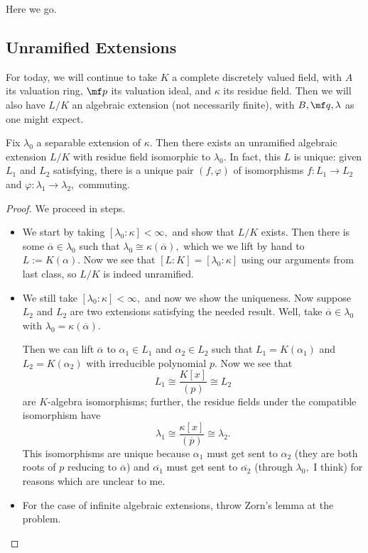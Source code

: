 \documentclass[../notes.tex]{subfiles}
\begin{document}















Here we go.

\subsection{Unramified Extensions}
For today, we will continue to take $K$ a complete discretely valued field, with $A$ its valuation ring, $\mf p$ its valuation ideal, and $\kappa$ its residue field. Then we will also have $L/K$ an algebraic extension (not necessarily finite), with $B,\mf q,\lambda$ as one might expect.
\begin{proposition}
	Fix $\lambda_0$ a separable extension of $\kappa.$ Then there exists an unramified algebraic extension $L/K$ with residue field isomorphic to $\lambda_0.$ In fact, this $L$ is unique: given $L_1$ and $L_2$ satisfying, there is a unique pair $(f,\varphi)$ of isomorphisms $f:L_1\to L_2$ and $\varphi:\lambda_1\to\lambda_2,$ commuting.
\end{proposition}
\begin{proof}
	We proceed in steps.
	\begin{itemize}
		\item We start by taking $[\lambda_0:\kappa]<\infty,$ and show that $L/K$ exists. Then there is some $\overline\alpha\in\lambda_0$ such that $\lambda_0\cong\kappa(\overline\alpha),$ which we we lift by hand to $L:=K(\alpha).$ Now we see that $[L:K]=[\lambda_0:\kappa]$ using our arguments from last class, so $L/K$ is indeed unramified.
		\item We still take $[\lambda_0:\kappa]<\infty,$ and now we show the uniqueness. Now suppose $L_2$ and $L_2$ are two extensions satisfying the needed result. Well, take $\overline\alpha\in\lambda_0$ with $\lambda_0=\kappa(\overline\alpha).$

		Then we can lift $\overline\alpha$ to $\alpha_1\in L_1$ and $\alpha_2\in L_2$ such that $L_1=K(\alpha_1)$ and $L_2=K(\alpha_2)$ with irreducible polynomial $p.$ Now we see that
		\[L_1\cong\frac{K[x]}{(p)}\cong L_2\]
		are $K$-algebra isomorphisms; further, the residue fields under the compatible isomorphism have
		\[\lambda_1\cong\frac{\kappa[x]}{(\overline p)}\cong\lambda_2.\]
		This isomorphisms are unique because $\alpha_1$ must get sent to $\alpha_2$ (they are both roots of $p$ reducing to $\overline\alpha$) and $\overline{\alpha_1}$ must get sent to $\overline{\alpha_2}$ (through $\lambda_0,$ I think) for reasons which are unclear to me. \todo{}
		\item For the case of infinite algebraic extensions, throw Zorn's lemma at the problem.
		\qedhere
	\end{itemize}
\end{proof}
\end{document}
